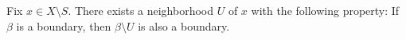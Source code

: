 
Fix $x \in X \setminus S$. There exists a neighborhood $U$ of $x$ with the following property: If $\beta$ is a boundary, then $\beta \setminus U$ is also a boundary.
